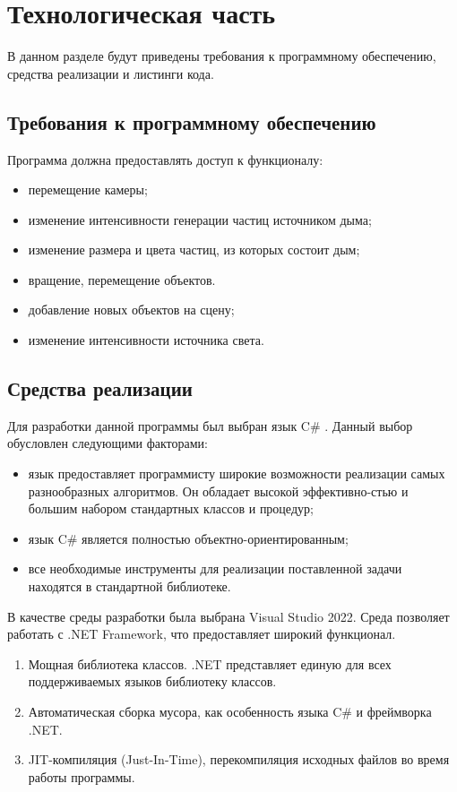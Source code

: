 \chapter{Технологическая часть}

В данном разделе будут приведены требования к программному обеспечению, средства реализации и листинги кода.

\section{Требования к программному обеспечению} 
Программа должна предоставлять доступ к функционалу: 
\begin{itemize}[label=---]
	\item перемещение камеры;
	\item изменение интенсивности генерации частиц источником дыма; 
	\item изменение размера и цвета частиц, из которых состоит дым;
	\item вращение, перемещение объектов.
	\item добавление новых объектов на сцену;
	\item изменение интенсивности источника света.
\end{itemize}

\section{Средства реализации}

Для разработки данной программы был выбран язык C\# \cite{sharplang}. Данный выбор обусловлен следующими факторами:
\begin{itemize}[label=---]
	\item язык предоставляет программисту широкие возможности реализации самых разнообразных алгоритмов. Он обладает высокой эффективно-стью и большим набором стандартных классов и процедур;
	\item язык C\# является полностью объектно-ориентированным;
	\item все необходимые инструменты для реализации поставленной задачи находятся в стандартной библиотеке.
\end{itemize}
В качестве среды разработки была выбрана Visual Studio 2022. Среда позволяет работать с .NET Framework, что предоставляет широкий функционал.
\begin{enumerate} 
	\item Мощная библиотека классов. .NET представляет единую для всех поддерживаемых языков библиотеку классов.
	\item Автоматическая сборка мусора, как особенность языка C\# и фреймворка .NET.
	\item JIT-компиляция (Just-In-Time), перекомпиляция исходных файлов во время работы программы.
\end{enumerate}

